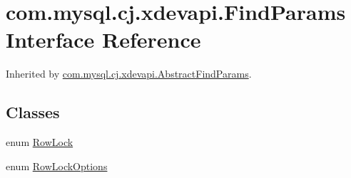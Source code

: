 \hypertarget{interfacecom_1_1mysql_1_1cj_1_1xdevapi_1_1_find_params}{}\section{com.\+mysql.\+cj.\+xdevapi.\+Find\+Params Interface Reference}
\label{interfacecom_1_1mysql_1_1cj_1_1xdevapi_1_1_find_params}


Inherited by \mbox{\hyperlink{classcom_1_1mysql_1_1cj_1_1xdevapi_1_1_abstract_find_params}{com.\+mysql.\+cj.\+xdevapi.\+Abstract\+Find\+Params}}.

\subsection*{Classes}
\begin{DoxyCompactItemize}
\item 
enum \mbox{\hyperlink{enumcom_1_1mysql_1_1cj_1_1xdevapi_1_1_find_params_1_1_row_lock}{Row\+Lock}}
\item 
enum \mbox{\hyperlink{enumcom_1_1mysql_1_1cj_1_1xdevapi_1_1_find_params_1_1_row_lock_options}{Row\+Lock\+Options}}
\end{DoxyCompactItemize}
